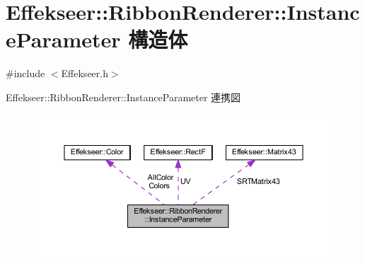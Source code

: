 \hypertarget{struct_effekseer_1_1_ribbon_renderer_1_1_instance_parameter}{}\section{Effekseer\+:\+:Ribbon\+Renderer\+:\+:Instance\+Parameter 構造体}
\label{struct_effekseer_1_1_ribbon_renderer_1_1_instance_parameter}


{\ttfamily \#include $<$Effekseer.\+h$>$}



Effekseer\+:\+:Ribbon\+Renderer\+:\+:Instance\+Parameter 連携図\nopagebreak
\begin{figure}[H]
\begin{center}
\leavevmode
\includegraphics[width=350pt]{struct_effekseer_1_1_ribbon_renderer_1_1_instance_parameter__coll__graph}
\end{center}
\end{figure}
